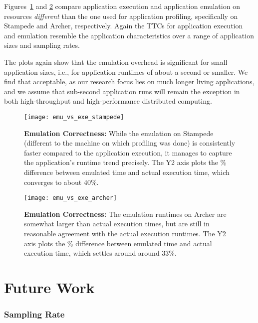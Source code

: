 \documentclass[10pt, conference, compsocconf]{IEEEtran}
\newcommand{\I}[1]{\textit{#1}\xspace}
\begin{document}
 Figures~\ref{fig:exe_emu_stampede} and \ref{fig:exe_emu_archer}
 compare application execution and application emulation on resources
 \I{different} than the one used for application profiling,
 specifically on Stampede and Archer, respectively.  Again the TTCs
 for application execution and emulation resemble the application
 characteristics over a range of application sizes and sampling rates.

 The plots again show that the emulation overhead is significant for
 small application sizes, i.e., for application runtimes of about a
 second or smaller.  We find that acceptable, as our research focus
 lies on much longer living applications, and we assume that
 sub-second application runs will remain the exception in both
 high-throughput and high-performance distributed computing.

 \begin{figure}[t]
   \centering
   \texttt{[image: emu\_vs\_exe\_stampede]}
   \caption{\textbf{Emulation Correctness:} While the emulation on Stampede
     (different to the machine on which profiling was done) is consistently
     faster compared to the application execution, it manages to capture the
     application's runtime trend precisely. The Y2 axis plots the \% difference
     between emulated time and actual execution time, which converges to about
     40\%.
    \label{fig:exe_emu_stampede} 
   } 
   \end{figure}

 \begin{figure}[t]
   \centering
   \texttt{[image: emu\_vs\_exe\_archer]}
   \caption{\textbf{Emulation Correctness:} The emulation runtimes on
       Archer are somewhat larger than actual execution times, but are
       still in reasonable agreement with the actual execution
       runtimes. The Y2 axis plots the \% difference between emulated
       time and actual execution time, which settles around around
       33\%.
       \label{fig:exe_emu_archer} 
   } 
   \end{figure}

\section{Future Work} 
\label{sec:future}

 \subsubsection*{Sampling Rate}
\end{document}
